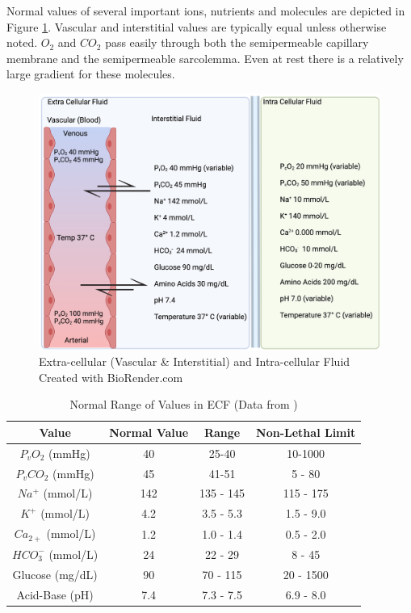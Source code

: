 Normal values of several important ions, nutrients and molecules are depicted in Figure \ref{fig:ecf}. Vascular and interstitial values are typically equal unless otherwise noted. $O_2$ and $CO_2$ pass easily through both the semipermeable capillary membrane and the semipermeable sarcolemma. Even at rest there is a relatively large gradient for these molecules. 

\begin{figure}[!h]
    \centering
    \includegraphics[width=1\linewidth]{./figure/ecf.png}
    \caption{Extra-cellular (Vascular \& Interstitial) and Intra-cellular Fluid \footnotesize{Created with BioRender.com}}
    \label{fig:ecf}
\end{figure}

\begin{table}[h!]
\centering
\begin{tabular}{||c c c c||} 
 \hline
Value & Normal Value & Range & Non-Lethal Limit\\ [0.5ex] 
 \hline\hline
 $P_v O_2$ (mmHg) & 40  & 25-40 & 10-1000 \\
 $P_v CO_2$ (mmHg) & 45 & 41-51 & 5 - 80\\ 
 $Na^+$ (mmol/L) & 142 & 135 - 145 & 115 - 175\\
 $K^+$  (mmol/L) & 4.2 & 3.5 - 5.3 & 1.5 - 9.0\\ 
 $Ca_{2+}$ (mmol/L) & 1.2 & 1.0 - 1.4 & 0.5 - 2.0 \\
 $HCO_3 ^-$ (mmol/L)& 24 & 22 - 29 & 8 - 45 \\
 Glucose (mg/dL)& 90 & 70 - 115 & 20 - 1500 \\
 Acid-Base (pH) & 7.4 & 7.3 - 7.5 & 6.9 - 8.0 \\[1ex] 
 \hline
\end{tabular}
\caption{Normal Range of Values in ECF (\footnotesize{Data from \cite{feher_quantitative_2017}})}
\label{table:ecf_value_ranges}
\end{table}

